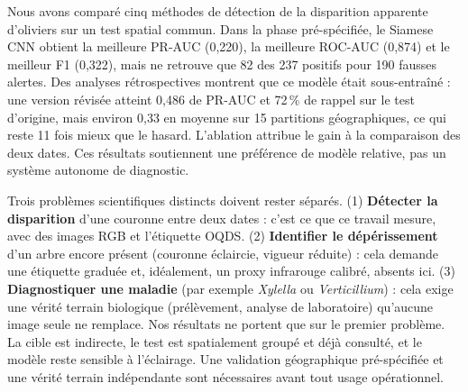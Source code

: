 \documentclass[10pt,a4paper,twocolumn]{article}
\makeatletter
\renewcommand\section{\@startsection{section}{1}{\z@}{-1.6ex plus -.4ex}{0.7ex}{\normalfont\large\bfseries\color{olive}}}
\makeatother
\begin{document}
\section{Conclusion}
Nous avons comparé cinq méthodes de détection de la disparition apparente d'oliviers sur un test spatial commun. Dans la
phase pré-spécifiée, le Siamese CNN obtient la meilleure PR-AUC (0,220), la meilleure ROC-AUC (0,874) et le meilleur F1
(0,322), mais ne retrouve que 82 des 237 positifs pour 190 fausses alertes. Des analyses rétrospectives montrent que ce modèle
était sous-entraîné : une version révisée atteint 0,486 de PR-AUC et 72\,\% de rappel sur le test d'origine, mais environ 0,33
en moyenne sur 15 partitions géographiques, ce qui reste 11 fois mieux que le hasard. L'ablation attribue le gain à la
comparaison des deux dates. Ces résultats soutiennent une préférence de modèle relative, pas un système autonome de diagnostic.

Trois problèmes scientifiques distincts doivent rester séparés. (1) \textbf{Détecter la disparition} d'une couronne entre deux
dates : c'est ce que ce travail mesure, avec des images RGB et l'étiquette OQDS. (2) \textbf{Identifier le dépérissement}
d'un arbre encore présent (couronne éclaircie, vigueur réduite) : cela demande une étiquette graduée et, idéalement, un proxy
infrarouge calibré, absents ici. (3) \textbf{Diagnostiquer une maladie} (par exemple \emph{Xylella} ou \emph{Verticillium}) :
cela exige une vérité terrain biologique (prélèvement, analyse de laboratoire) qu'aucune image seule ne remplace. Nos
résultats ne portent que sur le premier problème. La cible est indirecte, le test est spatialement groupé et déjà consulté, et
le modèle reste sensible à l'éclairage. Une validation géographique pré-spécifiée et une vérité terrain indépendante sont
nécessaires avant tout usage opérationnel.
\end{document}
